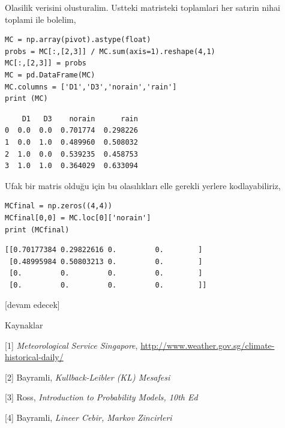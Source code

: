\documentclass[12pt,fleqn]{article}\usepackage{../../common}
\begin{document}
Olasilik verisini olusturalim. Ustteki matristeki toplamlari her satırin nihai
toplami ile bolelim,

\begin{verbatim}
MC = np.array(pivot).astype(float)
probs = MC[:,[2,3]] / MC.sum(axis=1).reshape(4,1)
MC[:,[2,3]] = probs
MC = pd.DataFrame(MC)
MC.columns = ['D1','D3','norain','rain']
print (MC)
\end{verbatim}

\begin{verbatim}
    D1   D3    norain      rain
0  0.0  0.0  0.701774  0.298226
1  0.0  1.0  0.489960  0.508032
2  1.0  0.0  0.539235  0.458753
3  1.0  1.0  0.364029  0.633094
\end{verbatim}

Ufak bir matris olduğu için bu olasılıkları elle gerekli yerlere kodlayabiliriz,

\begin{verbatim}
MCfinal = np.zeros((4,4))
MCfinal[0,0] = MC.loc[0]['norain']
print (MCfinal)
\end{verbatim}

\begin{verbatim}
[[0.70177384 0.29822616 0.         0.        ]
 [0.48995984 0.50803213 0.         0.        ]
 [0.         0.         0.         0.        ]
 [0.         0.         0.         0.        ]]
\end{verbatim}

[devam edecek]

Kaynaklar

[1] {\em Meteorological Service Singapore},
    \url{http://www.weather.gov.sg/climate-historical-daily/}

[2] Bayramli, {\em Kullback-Leibler (KL) Mesafesi}

[3] Ross, {\em Introduction to Probability Models, 10th Ed}

[4] Bayramli, {\em Lineer Cebir, Markov Zincirleri}
\end{document}
